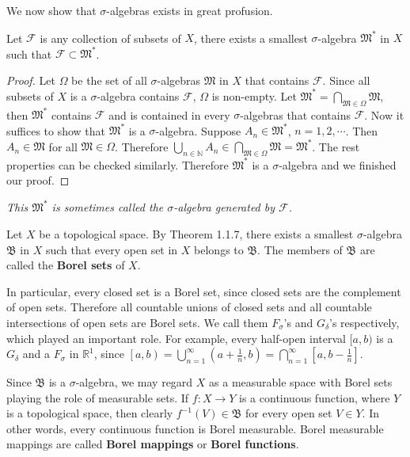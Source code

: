 We now show that $\sigma$-algebras exists in great profusion.
\begin{theorem}
Let $\mathcal{F}$ is any collection of subsets of $X$, there exists a smallest $\sigma$-algebra $\mathfrak{M}^*$ in $X$ such that $\mathcal{F}\subset\mathfrak{M}^*$.
\end{theorem}
\begin{proof}
Let $\Omega$ be the set of all $\sigma$-algebras $\mathfrak{M}$ in $X$ that contains $\mathcal{F}$. Since all subsets of $X$ is a $\sigma$-algebra contains $\mathcal{F}$, $\Omega$ is non-empty. Let $\mathfrak{M}^*=\bigcap_{\mathfrak{M}\in\Omega}\mathfrak{M}$, then $\mathfrak{M}^*$ contains $\mathcal{F}$ and is contained in every $\sigma$-algebras that contains $\mathcal{F}$. Now it suffices to show that $\mathfrak{M}^*$ is a $\sigma$-algebra. Suppose $A_n\in\mathfrak{M}^*$, $n=1,2,\cdots$. Then $A_n\in\mathfrak{M}$ for all $\mathfrak{M}\in\Omega$. Therefore $\bigcup_{n\in \mathbb{N}}{A_n}\in \bigcap_{\mathfrak{M} \in \Omega}{\mathfrak{M}}=\mathfrak{M} ^*$. The rest properties can be checked similarly. Therefore $\mathfrak{M}^*$ is a $\sigma$-algebra and we finished our proof.
\end{proof}
\begin{note}\em
This $\mathfrak{M}^*$ is sometimes called the $\sigma$-algebra generated by $\mathcal{F}$.
\end{note}
Let $X$ be a topological space. By Theorem 1.1.7, there exists a smallest $\sigma$-algebra $\mathfrak{B}$ in $X$ such that every open set in $X$ belongs to $\mathfrak{B}$. The members of $\mathfrak{B}$ are called the \textbf{Borel sets} of $X$.\par
In particular, every closed set is a Borel set, since closed sets are the complement of open sets. Therefore all countable unions of closed sets and all countable intersections of open sets are Borel sets. We call them $F_\sigma$'s and $G_\delta$'s respectively, which played an important role. For example, every half-open interval $[a,b)$ is a $G_\delta$ and a $F_\sigma$ in $\mathbb{R}^1$, since $\left[ a,b \right) =\bigcup_{n=1}^{\infty}{\left( a+\frac{1}{n},b \right)}=\bigcap_{n=1}^{\infty}{\left[ a,b-\frac{1}{n} \right]}$.\par
Since $\mathfrak{B}$ is a $\sigma$-algebra, we may regard $X$ as a measurable space with Borel sets playing the role of measurable sets. If $f:X\to Y$ is a continuous function, where $Y$ is a topological space, then clearly $f^{-1}(V)\in\mathfrak{B}$ for every open set $V\in Y$. In other words, every continuous function is Borel measurable. Borel measurable mappings are called \textbf{Borel mappings} or \textbf{Borel functions}.
